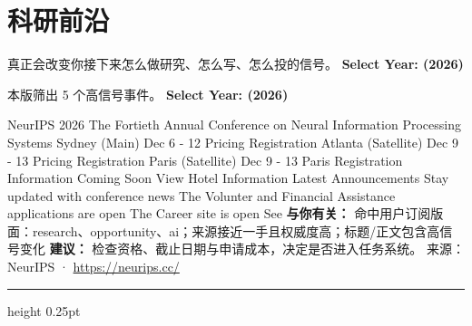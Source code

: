 \documentclass[10.5pt]{ctexart}
\begin{document}
\section*{科研前沿}
{\color{ormuted} 真正会改变你接下来怎么做研究、怎么写、怎么投的信号。}
\vspace{2mm}
{\LARGE\bfseries Select Year: (2026)}\par
\vspace{1mm}
{\color{ormuted} 本版筛出 5 个高信号事件。}
\vspace{3mm}
{\Large\bfseries Select Year: (2026)}\par
NeurIPS 2026 The Fortieth Annual Conference on Neural Information Processing Systems Sydney (Main) Dec 6 - 12 Pricing Registration Atlanta (Satellite) Dec 9 - 13 Pricing Registration Paris (Satellite) Dec 9 - 13 Paris Registration Information Coming Soon View Hotel Information Latest Announcements Stay updated with conference news The Volunter and Financial Assistance applications are open The Career site is open See
\textbf{与你有关：} 命中用户订阅版面：research、opportunity、ai；来源接近一手且权威度高；标题/正文包含高信号变化
\textbf{建议：} 检查资格、截止日期与申请成本，决定是否进入任务系统。
{\footnotesize\color{ormuted} 来源：NeurIPS · \url{https://neurips.cc/}}
\vspace{4mm}
\hrule height 0.25pt
\vspace{3mm}
\end{document}
